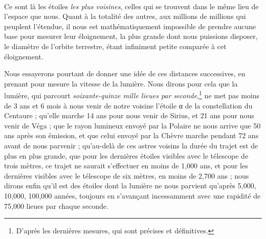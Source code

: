 \documentclass[a4paper, 11pt, oneside, landscape]{article}
\begin{document}
\paragraph{}
Ce sont là les étoiles \emph{les plus voisines}, celles qui se trouvent dans le même lieu de l'espace que nous. Quant à la totalité des autres, aux millions de millions qui peuplent l'étendue, il nous est mathématiquement impossible de prendre aucune base pour mesurer leur éloignement, la plus grande dont nous puissions disposer, le diamètre de l'orbite terrestre, étant infiniment petite comparée à cet éloignement.

Nous essayerons pourtant de donner une idée de ces distances successives, en prenant pour mesure la vitesse de la lumière. Nous dirons pour cela que la lumière, qui parcourt \emph{soixante-quinze mille lieues par seconde},\footnote{D'après les dernières mesures, qui sont précises et définitives.} ne met pas moins de 3 ans et 6 mois à nous venir de notre voisine l'étoile α de la constellation du Centaure ; qu'elle marche 14 ans pour nous venir de Sirius, et 21 ans pour nous venir de Véga ; que le rayon lumineux envoyé par la Polaire ne nous arrive que 50 ans après son émission, et que celui envoyé par la Chèvre marche pendant 72 ans avant de nous parvenir ; qu'au-delà de ces astres voisins la durée du trajet est de plus en plus grande, que pour les dernières étoiles visibles avec le télescope de trois mètres, ce trajet ne saurait s'effectuer en moins de 1,000 ans, et pour les dernières visibles avec le télescope de six mètres, en moins de 2,700 ans ; nous dirons enfin qu'il est des étoiles dont la lumière ne nous parvient qu'après 5,000, 10,000, 100,000 années, toujours en s'avançant incessamment avec une rapidité de 75,000 lieues par chaque seconde.
\end{document}
